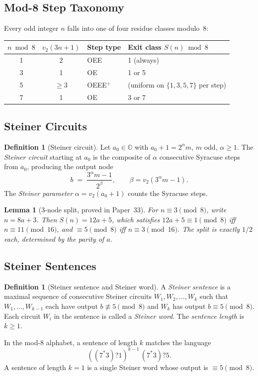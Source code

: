 \documentclass[12pt]{article}
\newtheorem{lemma}[theorem]{Lemma}
\theoremstyle{definition}
\newtheorem{definition}[theorem]{Definition}
\theoremstyle{remark}
\newcommand{\vt}{v_2}
\newcommand{\Sm}{S}
\begin{document}
\subsection{Mod-8 Step Taxonomy}

Every odd integer $n$ falls into one of four residue classes modulo~8:

\begin{center}
\begin{tabular}{ccll}
\toprule
$n \bmod 8$ & $\vt(3n+1)$ & Step type & Exit class $\Sm(n) \bmod 8$ \\
\midrule
1 & 2 & OEE  & 1 (always) \\
3 & 1 & OE   & 1 or 5 \\
5 & $\geq 3$ & OEEE$^+$ & (uniform on $\{1,3,5,7\}$ per step) \\
7 & 1 & OE   & 3 or 7 \\
\bottomrule
\end{tabular}
\end{center}

\subsection{Steiner Circuits}
\label{sec:steiner}

\begin{definition}[Steiner circuit]
\label{def:steiner}
Let $a_0 \in \mathbb{O}$ with $a_0 + 1 = 2^\alpha m$, $m$ odd, $\alpha \geq 1$.
The \emph{Steiner circuit} starting at $a_0$ is the composite of $\alpha$ consecutive
Syracuse steps from $a_0$, producing the output node
\[
  b \;=\; \frac{3^\alpha m - 1}{2^\beta}, \qquad \beta = \vt(3^\alpha m - 1).
\]
The \emph{Steiner parameter} $\alpha = \vt(a_0+1)$ counts the Syracuse steps.
\end{definition}

\begin{lemma}[3-node split, proved in Paper~33]
\label{lem:3node}
For $n \equiv 3 \pmod{8}$, write $n = 8a+3$. Then $\Sm(n) = 12a+5$, which satisfies
$12a+5 \equiv 1 \pmod{8}$ iff $n \equiv 11 \pmod{16}$, and $\equiv 5 \pmod{8}$
iff $n \equiv 3 \pmod{16}$. The split is exactly $1/2$ each, determined by the
parity of $a$.
\end{lemma}

\subsection{Steiner Sentences}
\label{sec:sentences}

\begin{definition}[Steiner sentence and Steiner word]
\label{def:sentence}
A \emph{Steiner sentence} is a maximal sequence of consecutive Steiner circuits
$W_1, W_2, \ldots, W_k$ such that $W_1, \ldots, W_{k-1}$ each have output
$b \not\equiv 5 \pmod{8}$ and $W_k$ has output $b \equiv 5 \pmod{8}$.
Each circuit $W_i$ in the sentence is called a \emph{Steiner word}.
The \emph{sentence length} is $k \geq 1$.

In the mod-8 alphabet, a sentence of length $k$ matches the language
\[
  ((7^*3)?1)^{k-1}\,(7^*3)?5.
\]
A sentence of length $k=1$ is a single Steiner word whose output is $\equiv 5\pmod{8}$.
\end{definition}
\end{document}
